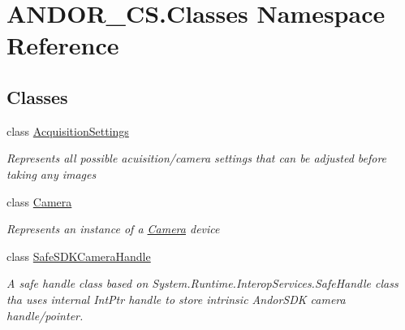 \hypertarget{namespace_a_n_d_o_r___c_s_1_1_classes}{}\section{A\+N\+D\+O\+R\+\_\+\+C\+S.\+Classes Namespace Reference}
\label{namespace_a_n_d_o_r___c_s_1_1_classes}
\subsection*{Classes}
\begin{DoxyCompactItemize}
\item 
class \hyperlink{class_a_n_d_o_r___c_s_1_1_classes_1_1_acquisition_settings}{Acquisition\+Settings}
\begin{DoxyCompactList}\small\item\em Represents all possible acuisition/camera settings that can be adjusted before taking any images \end{DoxyCompactList}\item 
class \hyperlink{class_a_n_d_o_r___c_s_1_1_classes_1_1_camera}{Camera}
\begin{DoxyCompactList}\small\item\em Represents an instance of a \hyperlink{class_a_n_d_o_r___c_s_1_1_classes_1_1_camera}{Camera} device \end{DoxyCompactList}\item 
class \hyperlink{class_a_n_d_o_r___c_s_1_1_classes_1_1_safe_s_d_k_camera_handle}{Safe\+S\+D\+K\+Camera\+Handle}
\begin{DoxyCompactList}\small\item\em A safe handle class based on System.\+Runtime.\+Interop\+Services.\+Safe\+Handle class tha uses internal Int\+Ptr handle to store intrinsic Andor\+S\+DK camera handle/pointer. \end{DoxyCompactList}\end{DoxyCompactItemize}
